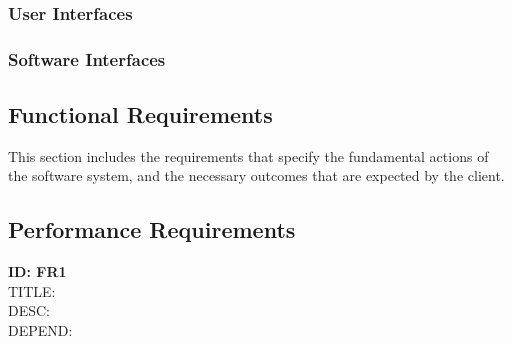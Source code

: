 \documentclass[onecolumn, draftclsnofoot,10pt, compsoc]{IEEEtran}
\begin{document}
		\subsubsection{User Interfaces}
		\subsubsection{Software Interfaces}
	\subsection{Functional Requirements}
This section includes the requirements that specify the fundamental actions of the software system, and the necessary outcomes that are expected by the client.

	\subsection{Performance Requirements}
\textbf{ID: FR1} \\
	TITLE: \\
	DESC: \\
	DEPEND: \\

	\newpage
\end{document}
